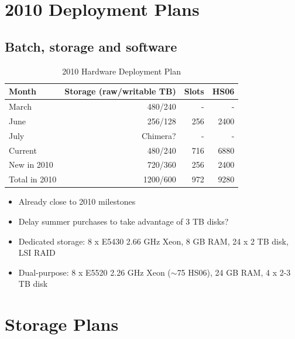 \documentclass{beamer}
\newcommand{\ca}{\ensuremath{\sim}}
\begin{document}
\section{2010 Deployment Plans}
\subsection{Batch, storage and software}
\begin{frame}
\begin{table}
\begin{tabular}{lrrr}
	\toprule
	Month					 	&	Storage (raw/writable TB)	&	Slots		& HS06 \\
	\midrule
	March					 	&	480/240										& - 			& - \\
	June						&	256/128										& 256			& 2400 \\
	July						&	Chimera?									&	-				&	- \\
	\midrule
	Current					& 480/240										& 716			& 6880 \\
	New in 2010			&	720/360										& 256 		& 2400 \\
	Total in 2010		&	1200/600									& 972 		& 9280 \\
	\bottomrule
\end{tabular}
\caption{2010 Hardware Deployment Plan}
\label{2010_hardware deployment_plan}
\end{table}

\begin{itemize}
	\item Already close to 2010 milestones
	\item Delay summer purchases to take advantage of 3 TB disks?
	\item Dedicated storage: 8 x E5430 2.66 GHz Xeon, 8 GB RAM, 24 x 2 TB disk, LSI RAID
	\item Dual-purpose: 8 x E5520 2.26 GHz Xeon (\ca{}75 HS06), 24 GB RAM, 4 x 2-3 TB disk
\end{itemize}

\end{frame}

\section{Storage Plans}
\end{document}
